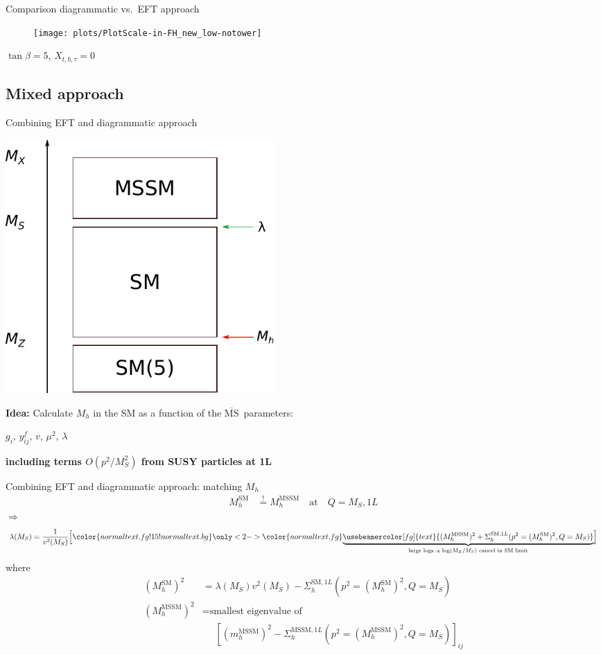 \documentclass[hyperref={pdfpagelabels=false},ngerman]{beamer}
\renewcommand{\emph}{\textbf}
\newcommand{\MSbar}{\ensuremath{\overline{\text{MS}}}}
\newcommand{\SM}{\ensuremath{\text{SM}}}
\newcommand{\MSSM}{\ensuremath{\text{MSSM}}}
\begin{document}
\begin{frame}{Comparison diagrammatic vs.\ EFT approach}
  \begin{figure}
    \centering
    \texttt{[image: plots/PlotScale-in-FH\_new\_low-notower]}
  \end{figure}
  $\tan\beta = 5$, $X_{t,b,\tau} = 0$
\end{frame}


\subsection{Mixed approach}

\begin{frame}{Combining EFT and diagrammatic approach}
  \begin{center}
    \includegraphics[width=0.45\textwidth]{images/mssm-sm-tower-eft}\\[1em]
  \end{center}
  \emph{Idea:} Calculate $M_h$ in the SM as a function of the \MSbar\ parameters:\\[1em]
  \begin{center}
    $g_i$, $y^f_{ij}$, $v$, $\mu^2$, $\lambda$
  \end{center}
  \emph{including terms $O(p^2/M_S^2)$ from SUSY particles at 1L}
\end{frame}

\begin{frame}{Combining EFT and diagrammatic approach: matching $M_h$}
  \begin{align*}
    M_h^{\SM} &\overset{!}{=} M_h^\text{MSSM} \quad \text{at} \quad Q = M_S, 1L
  \end{align*}
  $\Rightarrow$
  \begin{align*}
    \lambda(M_S) = \frac{1}{v^2(M_S)} \Big[
    {\color{normal text.fg!15!normal text.bg}
    \only<2->{\color{normal text.fg}}{%
    \underbrace{\usebeamercolor[fg]{text}{(M_h^\text{MSSM})^2 + \Sigma^{\SM,1L}_h(p^2 = (M_h^\SM)^2,Q = M_S)}}_{\text{large logs $\propto\log(M_Z/M_S)$ cancel in SM limit}}}}
    \Big]
  \end{align*}
  where
  \begin{align*}
    (M_h^{\SM})^2 &= \lambda(M_S) v^2(M_S) - \Sigma^{\SM,1L}_h(p^2 = (M_h^{\SM})^2,Q = M_S) \\
    (M_h^\text{MSSM})^2 &= \text{smallest eigenvalue of} \\
    &\phantom{={}} \left[(m_h^\text{MSSM})^2 - \Sigma^{\MSSM,1L}_h(p^2 = (M_h^\text{MSSM})^2,Q = M_S)\right]_{ij}
  \end{align*}
\end{frame}
\end{document}
